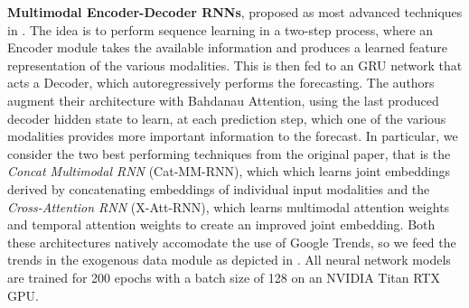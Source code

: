 \documentclass{article}
\begin{document}
\textbf{Multimodal Encoder-Decoder RNNs}, proposed as most advanced techniques in \cite{ekambaram_attention_2020}. The idea is to perform sequence learning in a two-step process, where an Encoder module takes the available information and produces a learned feature representation of the various modalities. This is then fed to an GRU\cite{cho2014learning} network that acts a Decoder, which autoregressively performs the forecasting. The authors augment their architecture with Bahdanau Attention\cite{bahdanau2016neural}, using the last produced decoder hidden state to learn, at each prediction step, which one of the various modalities provides more important information to the forecast. In particular, we consider the two best performing techniques from the original paper, that is the \emph{Concat Multimodal RNN} (Cat-MM-RNN), which which learns joint embeddings derived by concatenating embeddings of individual input modalities and the \emph{Cross-Attention RNN} (X-Att-RNN), which learns multimodal attention weights and temporal attention weights to create an improved joint embedding. Both these architectures natively accomodate the use of Google Trends, so we feed the trends in the exogenous data module as depicted in \cite{ekambaram_attention_2020}. All neural network models are trained for 200 epochs with a batch size of 128 on an NVIDIA Titan RTX GPU.
\end{document}
